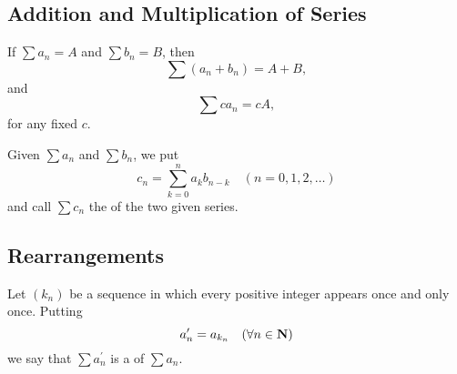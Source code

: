 \subsection{Addition and Multiplication of Series}
\begin{proposition}
If $\sum a_n=A$ and $\sum b_n=B$, then
\[\sum(a_n+b_n)=A+B,\]
and
\[\sum ca_n=cA,\]
for any fixed $c$.
\end{proposition}

\begin{definition}
Given $\sum a_n$ and $\sum b_n$, we put
\[c_n=\sum_{k=0}^{n}a_k b_{n-k}\quad(n=0,1,2,\dots)\]
and call $\sum c_n$ the  of the two given series.
\end{definition}

\subsection{Rearrangements}
\begin{definition}[Rearrangement]
Let $(k_n)$ be a sequence in which every positive integer appears once and only once. Putting
\[a_n^\prime=a_{k_n}\quad(\forall n\in\mathbf N)\]
we say that $\sum a_n^\prime$ is a  of $\sum a_n$.
\end{definition}